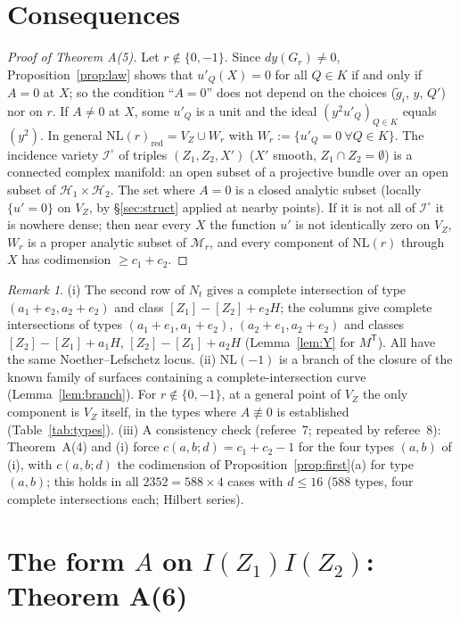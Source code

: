 \documentclass[11pt]{article}
\numberwithin{equation}{section}
\theoremstyle{remark}
\newtheorem{remark}[theorem]{Remark}
\newcommand{\NL}{\mathrm{NL}}
\newcommand{\VZ}{V_Z}
\newcommand{\cM}{\mathcal{M}}
\newcommand{\cI}{\mathcal{I}}
\newcommand{\cH}{\mathcal{H}}
\newcommand{\gt}{\tilde g}
\begin{document}
\section{Consequences}\label{sec:cons}

\begin{proof}[Proof of Theorem A(5)]
Let $r\notin\{0,-1\}$. Since $dy(G_r)\ne0$, Proposition~\ref{prop:law} shows that $u'_Q(X)=0$ for all $Q\in K$ if
and only if $A=0$ at $X$; so the condition ``$A=0$'' does not depend on the choices ($\gt_i$, $y$, $Q'$) nor on
$r$. If $A\ne0$ at $X$, some $u'_Q$ is a unit and the ideal $(y^2u'_Q)_{Q\in K}$ equals $(y^2)$. In general
$\NL(r)_{\mathrm{red}}=\VZ\cup W_r$ with $W_r:=\{u'_Q=0\ \forall Q\in K\}$. The incidence variety $\cI^\circ$ of
triples $(Z_1,Z_2,X')$ ($X'$ smooth, $Z_1\cap Z_2=\emptyset$) is a connected complex manifold: an open subset of
a projective bundle over an open subset of $\cH_1\times\cH_2$. The set where $A=0$ is a closed analytic subset
(locally $\{u'=0\}$ on $\VZ$, by \S\ref{sec:struct} applied at nearby points). If it is not all of $\cI^\circ$ it
is nowhere dense; then near every $X$ the function $u'$ is not identically zero on $\VZ$, $W_r$ is a proper
analytic subset of $\cM_r$, and every component of $\NL(r)$ through $X$ has codimension $\ge c_1+c_2$.
\end{proof}

\begin{remark}\label{rem:rows}
(i) The second row of $N_t$ gives a complete intersection of type $(a_1+e_2,a_2+e_2)$ and class
$[Z_1]-[Z_2]+e_2H$; the columns give complete intersections of types $(a_1+e_1,a_1+e_2)$, $(a_2+e_1,a_2+e_2)$
and classes $[Z_2]-[Z_1]+a_1H$, $[Z_2]-[Z_1]+a_2H$ (Lemma~\ref{lem:Y} for $M^{\mathsf T}$). All have the same
Noether--Lefschetz locus. (ii) $\NL(-1)$ is a branch of the closure of the known family of surfaces containing a
complete-intersection curve (Lemma~\ref{lem:branch}). For $r\notin\{0,-1\}$, at a general point of $\VZ$ the only
component is $\VZ$ itself, in the types where $A\not\equiv0$ is established (Table~\ref{tab:types}). (iii) A
consistency check (referee~7; repeated by referee~8): Theorem~A(4) and (i) force $c(a,b;d)=c_1+c_2-1$ for the
four types $(a,b)$ of (i), with $c(a,b;d)$ the codimension of Proposition~\ref{prop:first}(a) for type $(a,b)$;
this holds in all $2352=588\times4$ cases with $d\le16$ ($588$ types, four complete intersections each; Hilbert
series).
\end{remark}

\section{The form \texorpdfstring{$A$}{A} on \texorpdfstring{$I(Z_1)I(Z_2)$}{I(Z1)I(Z2)}: Theorem A(6)}\label{sec:F}
\end{document}
